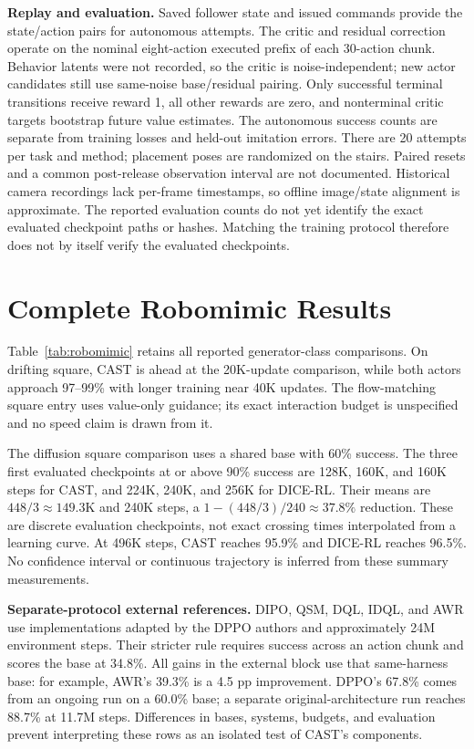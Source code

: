 \textbf{Replay and evaluation.}
Saved follower state and issued commands provide the state/action pairs
for autonomous attempts. The critic and residual correction operate on
the nominal eight-action executed prefix of each 30-action chunk.
Behavior latents were not recorded, so the critic is noise-independent;
new actor candidates still use same-noise base/residual pairing. Only
successful terminal transitions receive reward 1, all other rewards are
zero, and nonterminal critic targets bootstrap future value estimates.
The autonomous success counts are separate from training losses and
held-out imitation errors. There are 20 attempts per task and method;
placement poses are randomized on the stairs. Paired resets and a common
post-release observation interval are not documented. Historical camera
recordings lack per-frame timestamps, so offline image/state alignment
is approximate. The reported evaluation counts do not yet identify the
exact evaluated checkpoint paths or hashes. Matching the training protocol
therefore does not by itself verify the evaluated checkpoints.

\section{Complete Robomimic Results}
\label{supp:robomimic}

Table~\ref{tab:robomimic} retains all reported generator-class comparisons.
On drifting square, CAST is ahead at the 20K-update comparison, while
both actors approach 97--99\% with longer training near 40K updates.
The flow-matching square entry uses value-only guidance; its exact
interaction budget is unspecified and no speed claim is drawn from it.

The diffusion square comparison uses a shared base with 60\% success.
The three first evaluated checkpoints at or above 90\% success are
128K, 160K, and 160K steps for CAST, and 224K, 240K, and 256K for
DICE-RL. Their means are $448/3\approx149.3$K and 240K steps, a
$1-(448/3)/240\approx37.8\%$ reduction. These are discrete evaluation
checkpoints, not exact crossing times interpolated from a learning curve.
At 496K steps, CAST reaches 95.9\% and DICE-RL reaches 96.5\%.
No confidence interval or continuous trajectory is inferred from these
summary measurements.

\textbf{Separate-protocol external references.}
DIPO, QSM, DQL, IDQL, and AWR use implementations adapted by the DPPO
authors and approximately 24M environment steps. Their stricter rule
requires success across an action chunk and scores the base at 34.8\%.
All gains in the external block use that same-harness base: for example,
AWR's 39.3\% is a 4.5 pp improvement. DPPO's 67.8\% comes from an
ongoing run on a 60.0\% base; a separate original-architecture run
reaches 88.7\% at 11.7M steps. Differences in bases, systems, budgets,
and evaluation prevent interpreting these rows as an isolated test of
CAST's components.

